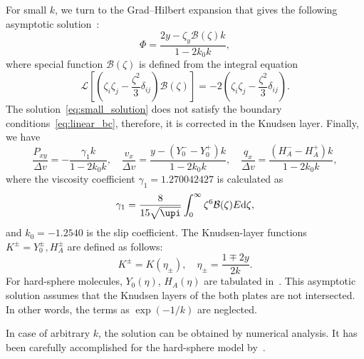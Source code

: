 \documentclass[]{jfm}
\newcommand{\dd}{\mathrm{d}}
\begin{document}
For small \(k\), we turn to the Grad--Hilbert expansion
that gives the following asymptotic solution~\citep{Ohwada1990, Sone2007}:
\begin{equation}\label{eq:small_solution}
    \Phi = \frac{2y - \zeta_y \mathcal{B}(\zeta) k}{1-2k_0k},
\end{equation}
where special function \(\mathcal{B}(\zeta)\) is defined from the integral equation
\begin{equation}\label{eq:transport_B}
    \mathcal{L}\left[\left(\zeta_i\zeta_j-\frac{\zeta^2}3\delta_{ij}\right) \mathcal{B}(\zeta)\right]
        = -2\left(\zeta_i\zeta_j-\frac{\zeta^2}3\delta_{ij}\right).
\end{equation}
The solution~\eqref{eq:small_solution} does not satisfy the boundary conditions~\eqref{eq:linear_bc},
therefore, it is corrected in the Knudsen layer. Finally, we have
\begin{equation}\label{eq:small_macro}
    \frac{P_{xy}}{\Delta{v}} = - \frac{\gamma_1 k}{1-2k_0k}, \quad
    \frac{v_x}{\Delta{v}} = \frac{y - (Y_0^--Y_0^+)k}{1-2k_0k}, \quad
    \frac{q_x}{\Delta{v}} = \frac{(H_A^--H_A^+)k}{1-2k_0k},
\end{equation}
where the viscosity coefficient \(\gamma_1 = 1.270042427\) is calculated as
\begin{equation}\label{eq:gamma_1}
    \gamma_1 = \frac{8}{15\sqrt{\upi}}\int_0^\infty \zeta^6 \mathcal{B}(\zeta)E\dd\zeta,
\end{equation}
and \(k_0 = -1.2540\) is the slip coefficient.
The Knudsen-layer functions \(K^\pm = Y_0^\pm, H_A^\pm\) are defined as follows:
\begin{equation}\label{eq:linear_knudsen_functions}
     K^\pm = K(\eta_\pm), \quad \eta_\pm = \frac{1 \mp 2y}{2k}.
\end{equation}
For hard-sphere molecules, \(Y_0(\eta)\), \(H_A(\eta)\)
are tabulated in~\citet{Ohwada1989a, Sone2002, Sone2007}.
This asymptotic solution assumes that the Knudsen layers of the both plates are not intersected.
In other words, the terms as \(\exp(-1/k)\) are neglected.

In case of arbitrary \(k\), the solution can be obtained by numerical analysis.
It has been carefully accomplished for the hard-sphere model by~\citet{Ohwada1990}.
\end{document}

